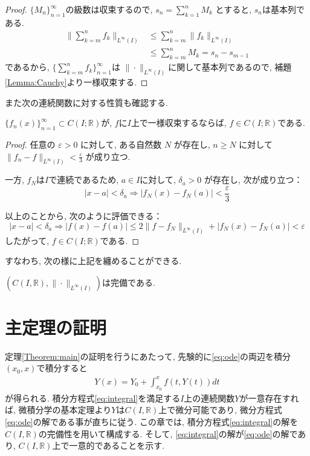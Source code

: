 \documentclass[12pt,xelatex,ja=standard]{bxjsarticle}
\begin{document}
\begin{proof}
$\{ M_n \}_{n=1}^{\infty}$の級数は収束するので,
$s_n = \sum_{k=1}^{n} M_k$ とすると, $s_n$は基本列である.
	\begin{align*}
	\bigg\| \sum_{k=m}^n f_k \bigg\|_{L^\infty(I)}
	&\leq \sum_{k=m}^n \| f_k \|_{L^\infty(I)}\\
	&\leq \sum_{k=m}^n M_k = s_n - s_{m-1}
	\end{align*}
であるから, $\{ \sum_{k=m}^n f_k \}_{n=1}^{\infty}$は
$\| \cdot \|_{L^\infty(I)}$に関して基本列であるので,
補題\ref{Lemma:Cauchy}より一様収束する.
\end{proof}

また次の連続関数に対する性質も確認する.

\begin{Lemma}
$\{f_n(x)\}_{n=1}^{\infty} \subset C(I;\mathbb R)$が,
$f$に$I$上で一様収束するならば,
$f \in C(I;\mathbb R)$である.
\end{Lemma}

\begin{proof}
任意の $\varepsilon > 0$ に対して,
ある自然数 $N$ が存在し, $n \geq N$ に対して
$\| f_n - f \|_{L^\infty(I)} < \frac{\varepsilon}{3}$ が成り立つ.

一方, $f_N$は$I$で連続であるため,
$a \in I$に対して, $\delta_a > 0$ が存在し, 次が成り立つ：
	\[
	| x - a | < \delta_a
	\Rightarrow | f_N(x) - f_N(a) | < \frac{\varepsilon}{3}
	\]

以上のことから, 次のように評価できる：
	\[
	| x - a | < \delta_a
	\Rightarrow | f(x) - f(a) |
	\leq 2 \| f - f_N \|_{L^\infty(I)}
	+ | f_N(x) - f_N(a) | < \varepsilon
	\]
したがって, $f \in C(I;\mathbb R)$である.
\end{proof}

すなわち, 次の様に上記を纏めることができる.

\begin{Corollary}
$(C(I,\mathbb{R}),\| \cdot \|_{L^\infty(I)})$は完備である.
\end{Corollary}

\section{主定理の証明}
\label{sec:微分方程式の初期値問題}
定理\ref{Theorem:main}の証明を行うにあたって,
先験的に\eqref{eq:ode}の両辺を積分$(x_{0},x)$で積分すると
	\begin{align}
	Y(x)=Y_{0}+\displaystyle \int_{x_{0}}^{x} f(t,Y(t)) dt
	\label{eq:integral}
	\end{align}
が得られる.
積分方程式\eqref{eq:integral}を満足する$I$上の連続関数$Y$が一意存在すれば,
微積分学の基本定理より$Y$は$C(I,\mathbb{R})$上で微分可能であり,
微分方程式\eqref{eq:ode}の解である事が直ちに従う.
この章では,
積分方程式\eqref{eq:integral}の解を
$C(I,\mathbb{R})$の完備性を用いて構成する.
そして, \eqref{eq:integral}の解が\eqref{eq:ode}の解であり,
$C(I,\mathbb{R})$上で一意的であることを示す.
\end{document}
